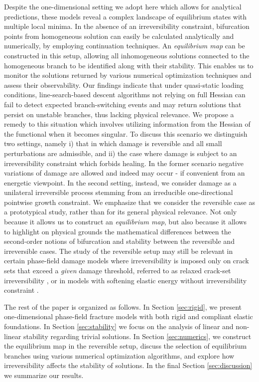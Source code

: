 \documentclass[10pt]{article}
\begin{document}
Despite the one-dimensional setting we adopt here which allows for analytical predictions, these models reveal a complex landscape of equilibrium states with multiple local minima.
In the absence of an irreversibility constraint, bifurcation points from homogeneous solution can easily be calculated analytically and numerically, by employing continuation techniques.
An \emph{equilibrium map} can be constructed in this setup, allowing all  {inhomogeneous} solutions connected to the homogeneous branch to be identified along with their stability.
This enables us to monitor the solutions returned by various numerical optimization techniques and assess their observability.
Our findings indicate that under quasi-static loading conditions, line-search-based descent algorithms not relying on full Hessian can fail to detect expected branch-switching events and may return solutions that persist on unstable branches, thus lacking physical relevance.
We propose a remedy to this situation which involves utilizing information from the Hessian of the functional when it becomes singular.
%
To discuss this scenario we distinguish two settings, namely i) that in which damage is reversible and all small perturbations are admissible, and ii) the case where damage is subject to an irreversibility constraint which forbids healing. In the former scenario  negative variations of damage are allowed and indeed may occur - if convenient from an energetic viewpoint. In the second setting, instead, we consider damage as a unilateral irreversible process stemming from an irreducible one-directional pointwise growth constraint.
    {We emphasize that we consider the reversible case as a prototypical study, rather than for its general physical relevance. Not only because it allows us to construct an \emph{equilibrium map}, but also because it allows to highlight on physical grounds the mathematical differences {between the second-order notions of bifurcation and stability} between the reversible and irreversible cases. The study of the reversible setup may still be relevant in certain phase-field damage models where irreversibility is imposed only on crack sets that exceed a \emph{given} damage threshold, referred to as relaxed crack-set irreversibility \cite{Bourdin2000-pc, Kumar2020-xz, De-Lorenzis2020-rz}, or  in models with softening elastic energy without irreversibility constraint \cite{Truskinovsky2010-st,Salman2019-kp,Salman2021-mn,Baggio2023-yo}.}


The rest of the paper is organized as follows. In Section \ref{sec:rigid}, we present one-dimensional phase-field fracture models with both rigid and compliant elastic foundations. In Section \ref{sec:stability} we focus on the analysis  of linear and non-linear stability regarding trivial solutions. In Section \ref{sec:numerics}, we construct the equilibrium map in the reversible setup, discuss the selection of equilibrium branches using various numerical optimization algorithms, and explore how irreversibility affects the stability of solutions. In the final Section \ref{sec:discussion}  we summarize our results.
\end{document}
